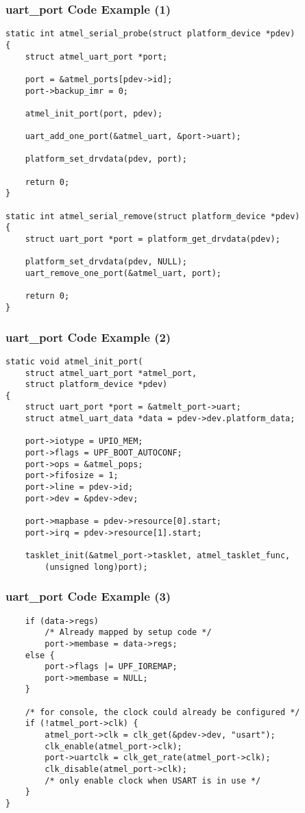 \begin{frame}[fragile]
  \frametitle{uart\_port Code Example (1)}
\begin{verbatim}
static int atmel_serial_probe(struct platform_device *pdev)
{
    struct atmel_uart_port *port;

    port = &atmel_ports[pdev->id];
    port->backup_imr = 0;

    atmel_init_port(port, pdev);

    uart_add_one_port(&atmel_uart, &port->uart);

    platform_set_drvdata(pdev, port);

    return 0;
}

static int atmel_serial_remove(struct platform_device *pdev)
{
    struct uart_port *port = platform_get_drvdata(pdev);

    platform_set_drvdata(pdev, NULL);
    uart_remove_one_port(&atmel_uart, port);

    return 0;
}
\end{verbatim}
\end{frame}

\begin{frame}[fragile]
\frametitle{uart\_port Code Example (2)}
\begin{verbatim}
static void atmel_init_port(
    struct atmel_uart_port *atmel_port,
    struct platform_device *pdev)
{
    struct uart_port *port = &atmelt_port->uart;
    struct atmel_uart_data *data = pdev->dev.platform_data;

    port->iotype = UPIO_MEM;
    port->flags = UPF_BOOT_AUTOCONF;
    port->ops = &atmel_pops;
    port->fifosize = 1;
    port->line = pdev->id;
    port->dev = &pdev->dev;

    port->mapbase = pdev->resource[0].start;
    port->irq = pdev->resource[1].start;

    tasklet_init(&atmel_port->tasklet, atmel_tasklet_func,
        (unsigned long)port);

\end{verbatim}
\end{frame}

\begin{frame}[fragile]
\frametitle{uart\_port Code Example (3)}
\begin{verbatim}
    if (data->regs)
        /* Already mapped by setup code */
        port->membase = data->regs;
    else {
        port->flags |= UPF_IOREMAP;
        port->membase = NULL;
    }

    /* for console, the clock could already be configured */
    if (!atmel_port->clk) {
        atmel_port->clk = clk_get(&pdev->dev, "usart");
        clk_enable(atmel_port->clk);
        port->uartclk = clk_get_rate(atmel_port->clk);
        clk_disable(atmel_port->clk);
        /* only enable clock when USART is in use */
    }
}
\end{verbatim}
\end{frame}


